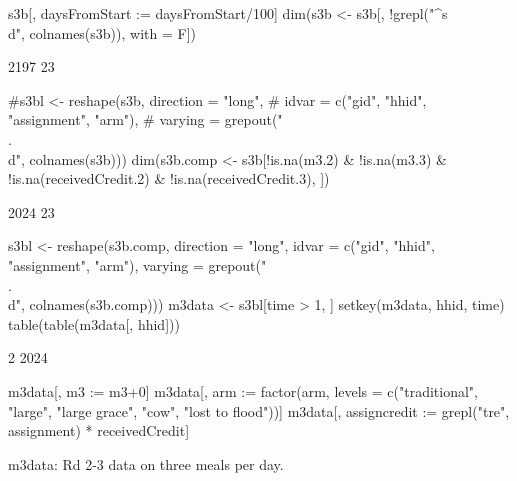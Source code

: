 \begin{Schunk}
\begin{Sinput}
s3b[, daysFromStart := daysFromStart/100]
dim(s3b <- s3b[, !grepl("^s\\d", colnames(s3b)), with = F])
\end{Sinput}
\begin{Soutput}
[1] 2197   23
\end{Soutput}
\begin{Sinput}
#s3bl <- reshape(s3b, direction = "long", 
#	idvar = c("gid", "hhid", "assignment", "arm"),
#	varying = grepout("\\.\\d", colnames(s3b)))
dim(s3b.comp <- s3b[!is.na(m3.2) & !is.na(m3.3) & 
	!is.na(receivedCredit.2) & !is.na(receivedCredit.3), ])
\end{Sinput}
\begin{Soutput}
[1] 2024   23
\end{Soutput}
\begin{Sinput}
s3bl <- reshape(s3b.comp, direction = "long", 
	idvar = c("gid", "hhid", "assignment", "arm"),
	varying = grepout("\\.\\d", colnames(s3b.comp)))
m3data <- s3bl[time > 1, ]
setkey(m3data, hhid, time)
table(table(m3data[, hhid]))
\end{Sinput}
\begin{Soutput}

   2 
2024 
\end{Soutput}
\begin{Sinput}
m3data[, m3 := m3+0]
m3data[, arm := factor(arm, levels = c("traditional", "large", "large grace", "cow", "lost to flood"))]
m3data[, assigncredit := grepl("tre", assignment) * receivedCredit]
\end{Sinput}
\end{Schunk}
\textsf{m3data}: Rd 2-3 data on three meals per day. 
